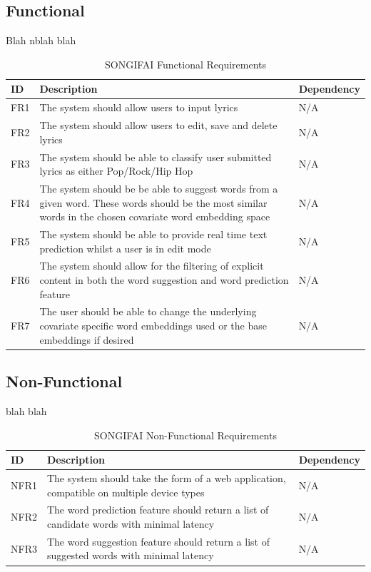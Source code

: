 \subsection{Functional}
Blah nblah blah
\begin{table}[h]
	\centering
	\begin{tabular}{ | l | p{10cm} | l | }
		\hline
		\textbf{ID} & \textbf{Description} & \textbf{Dependency} \\ \hline
		FR1 & The system should allow users to input lyrics & N/A \\ \hline
		FR2 & The system should allow users to edit, save and delete lyrics & N/A  \\ \hline
		FR3 & The system should be able to classify user submitted lyrics as either Pop/Rock/Hip Hop & N/A \\ \hline
		FR4 & The system should be be able to suggest words from a given word. These words should be the most similar words in the chosen covariate word embedding space & N/A \\ \hline
		FR5 & The system should be able to provide real time text prediction whilst a user is in edit mode & N/A \\ \hline
		FR6 & The system should allow for the filtering of explicit content in both the word suggestion and word prediction feature & N/A \\ \hline
		FR7 & The user should be able to change the underlying covariate specific word embeddings used or the base embeddings if desired& N/A \\ \hline
	\end{tabular}
	\label{Tab:Tcru}
	\caption{SONGIFAI Functional Requirements}
\end{table}
\subsection{Non-Functional}
blah blah
\begin{table}[ht]
\centering
	\begin{tabular}{ | l | p{10cm} | l | }
		\hline
		\textbf{ID} & \textbf{Description} & \textbf{Dependency} \\ \hline
		NFR1 & The system should take the form of a web application, compatible on multiple device types & N/A \\ \hline
		NFR2 & The word prediction feature should return a list of candidate words with minimal latency & N/A \\ \hline
		NFR3 & The word suggestion feature should return a list of suggested words with minimal latency & N/A \\ \hline
	\end{tabular}
	\label{Tab:Tcr}
	\caption{SONGIFAI Non-Functional Requirements}
\end{table}


